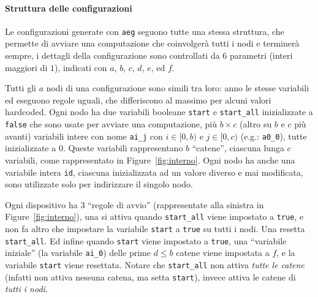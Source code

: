 \documentclass[target=bach]{thud}
\newcommand{\aeg}[0]{{\lstinline{aeg}}\xspace}
\begin{document}
\paragraph{Struttura delle configurazioni}

Le configurazioni generate con \aeg seguono tutte una stessa struttura, che permette di avviare una computazione che coinvolgerà tutti i nodi e terminerà sempre, i dettagli della configurazione sono controllati da $6$ parametri (interi maggiori di $1$), indicati con $a$, $b$, $c$, $d$, $e$, ed $f$.

Tutti gli $a$ nodi di una configurazione sono simili tra loro: anno le stesse variabili ed eseguono regole uguali, che differiscono al massimo per alcuni valori hardcoded. Ogni nodo ha due variabili booleane \lstinline{start} e \lstinline{start_all} inizializzate a \lstinline{false} che sono usate per avviare una computazione, più $b\times c$ (altro su $b$ e $c$ più avanti) variabili intere con nome \lstinline{ai_j} con $i\in [0,b)$ e $j\in [0,c)$ (e.g.: \lstinline{a0_0}), tutte inizializzate a $0$. Queste variabili rappresentano $b$ ``catene'', ciascuna lunga $c$ variabili, come rappresentato in Figure~\ref{fig:interno}. Ogni nodo ha anche una variabile intera \lstinline{id}, ciascuna inizializzata ad un valore diverso e mai modificata, sono utilizzate solo per indirizzare il singolo nodo.

Ogni dispositivo ha 3 ``regole di avvio'' (rappresentate alla sinistra in Figure~\ref{fig:interno}), una si attiva quando \lstinline{start_all} viene impostato a \lstinline{true}, e non fa altro che impostare la variabile \lstinline{start} a \lstinline{true} su tutti i nodi. Una resetta \lstinline{start_all}. Ed infine quando \lstinline{start} viene impostato a \lstinline{true}, una ``variabile iniziale'' (la variabile \lstinline{ai_0}) delle prime $d\leq b$ catene viene impostata a $f$, e la variabile \lstinline{start} viene resettata. Notare che \lstinline{start_all} non attiva \emph{tutte le catene} (infatti non attiva nessuna catena, ma setta \lstinline{start}), invece attiva le catene di \emph{tutti i nodi}.
\end{document}
